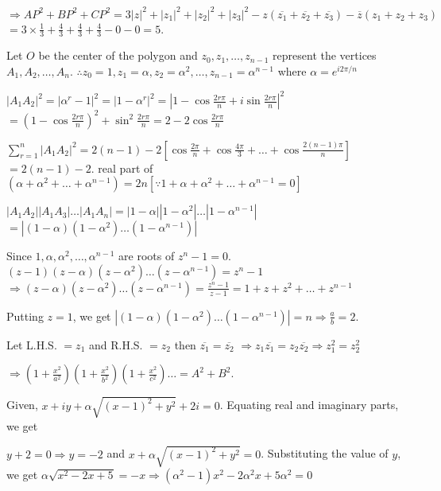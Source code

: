   $\Rightarrow AP^2 + BP^2 + CP^2 = 3|z|^2 + |z_1|^2 + |z_2|^2 + |z_3|^2 - z(\overline{z_1} + \overline{z_2}
  + \overline{z_3}) - \overline{z}(z_1 + z_2 + z_3)$
  $= 3\times\frac{1}{3} + \frac{4}{3} + \frac{4}{3} + \frac{4}{3} - 0 - 0 = 5$.
\item Let $O$ be the center of the polygon and $z_0, z_1, \ldots, z_{n - 1}$ represent the vertices $A_1, A_2,
  \ldots, A_n$. $\therefore z_0 = 1, z_1 = \alpha, z_2 = \alpha^2, \ldots, z_{n - 1} = \alpha^{n - 1}$ where
  $\alpha = e^{i2\pi/n}$

  $|A_1A_2|^2 =|\alpha^r - 1|^2 = |1 - \alpha^r|^2 = \left|1 - \cos\frac{2r\pi}{n} +
  i\sin\frac{2r\pi}{n}\right|^2$ $= \left(1 - \cos\frac{2r\pi}{n}\right)^2 + \sin^2\frac{2r\pi}{n} = 2 -
  2\cos\frac{2r\pi}{n}$

  $\displaystyle\sum_{r=1}^n |A_1A_2|^2 = 2(n - 1) - 2\left[\cos\frac{2\pi}{n} + \cos\frac{4\pi}{3} + \ldots
    + \cos\frac{2(n - 1)\pi}{n}\right]$
  $= 2(n - 1) -2.$ real part of $(\alpha + \alpha^2 + \ldots + \alpha^{n - 1}) = 2n [\because 1 + \alpha +
    \alpha^2 + \ldots + \alpha^{n - 1} = 0]$

  $|A_1A_2||A_1A_3|\ldots |A_1A_n| = |1 - \alpha||1 - \alpha^2|\ldots|1 - \alpha^{n - 1}|$ $= |(1 -
  \alpha)(1 - \alpha^2)\ldots(1 - \alpha^{n - 1})|$

  Since $1, \alpha, \alpha^2, \ldots, \alpha^{n - 1}$ are roots of $z^n - 1 = 0$. $(z - 1)(z - \alpha)(z -
  \alpha^2)\ldots(z - \alpha^{n - 1}) = z^n - 1$
  $\Rightarrow (z - \alpha)(z - \alpha^2)\ldots(z - \alpha^{n - 1}) = \frac{z^n - 1}{z - 1} = 1 + z + z^2 +
  \ldots + z^{n - 1}$

  Putting $z = 1$, we get
  $|(1 - \alpha)(1 - \alpha^2)\ldots(1 - \alpha^{n - 1})| = n \Rightarrow \frac{a}{b} = 2$.
\item Let L.H.S. $= z_1$ and R.H.S. $= z_2$ then $\overline{z_1} = \overline{z_2}$
  $\Rightarrow z_1\overline{z_1} = z_2\overline{z_2} \Rightarrow z_1^2 = z_2^2$

  $\Rightarrow \left(1 + \frac{x^2}{a^2}\right)\left(1 + \frac{x^2}{b^2}\right)\left(1 +
  \frac{x^2}{c^2}\right)\ldots = A^2 + B^2$.
\item Given, $x + iy + \alpha\sqrt{(x - 1)^2 + y^2} + 2i = 0$. Equating real and imaginary parts, we get

  $y + 2 = 0 \Rightarrow y = -2$ and $x + \alpha\sqrt{(x - 1)^2 + y^2} = 0$.
  Substituting the value of $y$, we get
  $\alpha\sqrt{x^2 - 2x + 5} = -x \Rightarrow (\alpha^2 - 1)x^2 - 2\alpha^2x +5\alpha^2 = 0$

